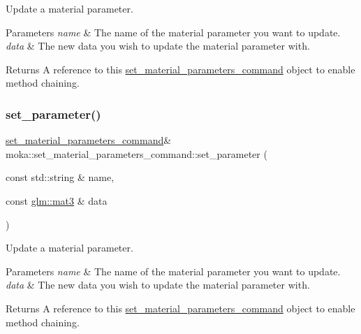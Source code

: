 Update a material parameter. 


\begin{DoxyParams}{Parameters}
{\em name} & The name of the material parameter you want to update. \\
\hline
{\em data} & The new data you wish to update the material parameter with. \\
\hline
\end{DoxyParams}
\begin{DoxyReturn}{Returns}
A reference to this \mbox{\hyperlink{classmoka_1_1set__material__parameters__command}{set\+\_\+material\+\_\+parameters\+\_\+command}} object to enable method chaining. 
\end{DoxyReturn}
\mbox{\label{classmoka_1_1set__material__parameters__command_a03bcba4c59e969fa1a123db947eab6d6}} 
\subsubsection{\texorpdfstring{set\_parameter()}{set\_parameter()}\hspace{0.1cm}{\footnotesize\ttfamily [4/6]}}
{\footnotesize\ttfamily \mbox{\hyperlink{classmoka_1_1set__material__parameters__command}{set\+\_\+material\+\_\+parameters\+\_\+command}}\& moka\+::set\+\_\+material\+\_\+parameters\+\_\+command\+::set\+\_\+parameter (\begin{DoxyParamCaption}\item[{const std\+::string \&}]{name,  }\item[{const \mbox{\hyperlink{namespacemoka_aed2224bc0e5b79e57a8975ded94ee1aaa0dd87e9dfdea657e8be233b5836821d0}{glm\+::mat3}} \&}]{data }\end{DoxyParamCaption})}



Update a material parameter. 


\begin{DoxyParams}{Parameters}
{\em name} & The name of the material parameter you want to update. \\
\hline
{\em data} & The new data you wish to update the material parameter with. \\
\hline
\end{DoxyParams}
\begin{DoxyReturn}{Returns}
A reference to this \mbox{\hyperlink{classmoka_1_1set__material__parameters__command}{set\+\_\+material\+\_\+parameters\+\_\+command}} object to enable method chaining. 
\end{DoxyReturn}
\mbox{\label{classmoka_1_1set__material__parameters__command_a63d3d8ddf55aa58967dd93c9f3619361}} 
